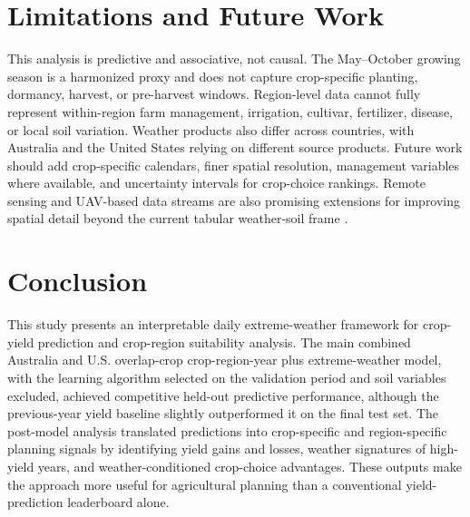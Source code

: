 \documentclass[11pt,a4paper]{article}
\begin{document}
\section{Limitations and Future Work}
This analysis is predictive and associative, not causal. The May--October growing season is a harmonized proxy and does not capture crop-specific planting, dormancy, harvest, or pre-harvest windows. Region-level data cannot fully represent within-region farm management, irrigation, cultivar, fertilizer, disease, or local soil variation. Weather products also differ across countries, with Australia and the United States relying on different source products. Future work should add crop-specific calendars, finer spatial resolution, management variables where available, and uncertainty intervals for crop-choice rankings. Remote sensing and UAV-based data streams are also promising extensions for improving spatial detail beyond the current tabular weather-soil frame \citep{Yuan2024UAVReview,Joshi2024TransferLearning}.

\section{Conclusion}
This study presents an interpretable daily extreme-weather framework for crop-yield prediction and crop-region suitability analysis. The main combined Australia and U.S. overlap-crop crop-region-year plus extreme-weather model, with the learning algorithm selected on the validation period and soil variables excluded, achieved competitive held-out predictive performance, although the previous-year yield baseline slightly outperformed it on the final test set. The post-model analysis translated predictions into crop-specific and region-specific planning signals by identifying yield gains and losses, weather signatures of high-yield years, and weather-conditioned crop-choice advantages. These outputs make the approach more useful for agricultural planning than a conventional yield-prediction leaderboard alone.
\end{document}
